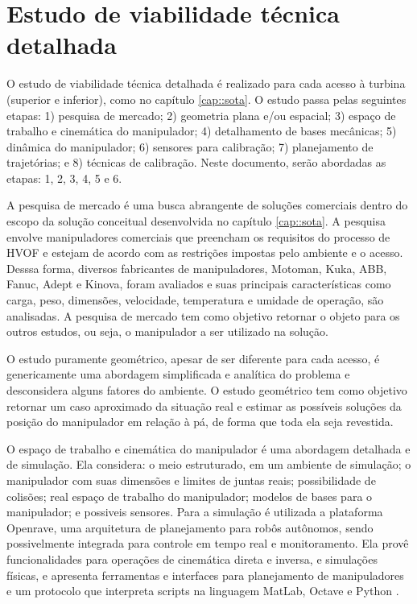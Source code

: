 \section{Estudo de viabilidade técnica detalhada}\label{sec::viatec} 

O estudo de viabilidade técnica detalhada é realizado para cada acesso à turbina
(superior e inferior), como no capítulo  \ref{cap::sota}. O estudo passa pelas
seguintes etapas: 1) pesquisa de mercado; 2) geometria plana e/ou espacial; 3)
espaço de trabalho e cinemática do manipulador; 4) detalhamento de
bases mecânicas; 5) dinâmica do manipulador; 6) sensores para calibração; 7)
planejamento de trajetórias; e 8) técnicas de calibração.
Neste documento, serão abordadas as etapas: 1, 2, 3, 4, 5 e 6.

A pesquisa de mercado é uma busca abrangente de soluções comerciais dentro do
escopo da solução conceitual desenvolvida no capítulo \ref{cap::sota}. A
pesquisa envolve manipuladores comerciais que preencham os requisitos do processo de HVOF e
estejam de acordo com as restrições impostas pelo ambiente e o acesso. Desssa
forma, diversos fabricantes de manipuladores, Motoman, Kuka, ABB, Fanuc,
Adept e Kinova, foram avaliados e suas principais características como carga,
peso, dimensões, velocidade, temperatura e umidade de operação, são analisadas.
A pesquisa de mercado tem como objetivo retornar o objeto para os outros
estudos, ou seja, o manipulador a ser utilizado na solução.

O estudo puramente geométrico, apesar de ser diferente para cada acesso, é
genericamente uma abordagem simplificada e analítica do problema e desconsidera
alguns fatores do ambiente. O estudo geométrico tem como objetivo retornar um caso
aproximado da situação real e estimar as possíveis soluções da posição do
manipulador em relação à pá, de forma que toda ela seja revestida.

O espaço de trabalho e cinemática do manipulador é uma abordagem
detalhada e de simulação. Ela considera: o meio estruturado, em um ambiente de
simulação; o manipulador com suas dimensões e limites de juntas reais;
possibilidade de colisões; real espaço de trabalho do manipulador; modelos de
bases para o manipulador; e possiveis sensores. Para a simulação é utilizada a
plataforma Openrave, uma arquitetura de planejamento para robôs autônomos,
sendo possivelmente integrada para controle em tempo real e monitoramento.
Ela provê funcionalidades para operações de cinemática direta e inversa, e
simulações físicas, e apresenta ferramentas e interfaces para planejamento de
manipuladores e um protocolo que interpreta scripts na linguagem MatLab, Octave
e Python \citep{diankov2008openrave}.

